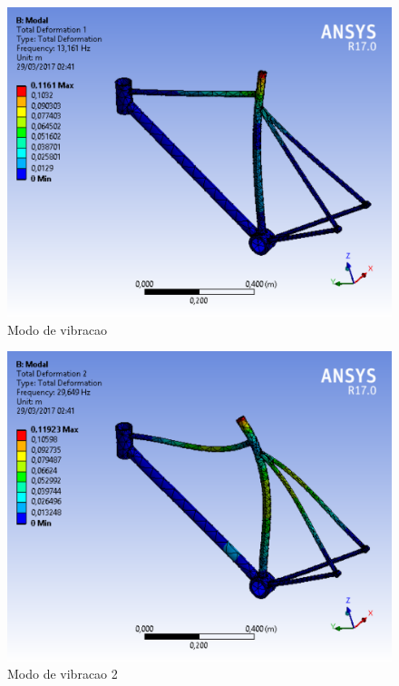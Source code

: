 \graphicspath{{figuras/}}
	\begin{figure}[h!]
	\centering
	\includegraphics[scale=0.80]{modo_de_vibracao.png}
	\caption{Modo de vibracao}
	\label{img:modo_de_vibracao}
	\end{figure}	
	
\graphicspath{{figuras/}}
	\begin{figure}[h!]
	\centering
	\includegraphics[scale=0.80]{modo_de_vibracao_2.png}
	\caption{Modo de vibracao 2}
	\label{img:modo_de_vibracao2}
	\end{figure}	
	
